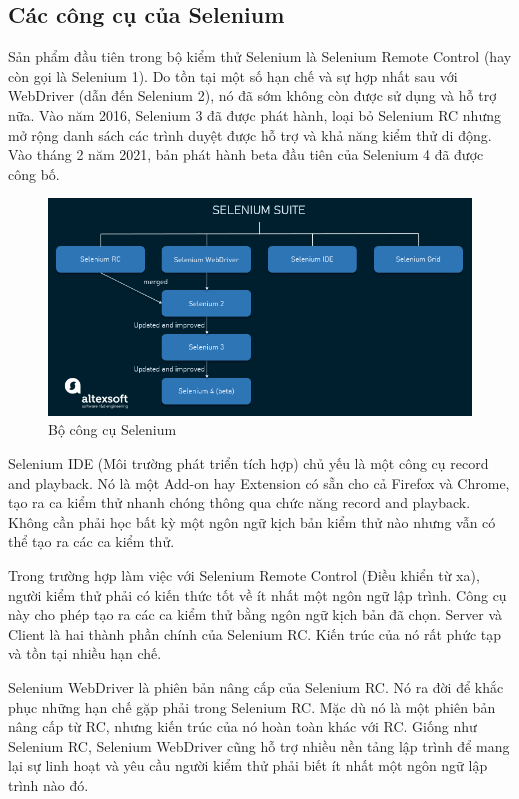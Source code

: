 \documentclass[./../main_file.tex]{subfiles}
\begin{document}
	\subsection{Các công cụ của Selenium}
	
	Sản phẩm đầu tiên trong bộ kiểm thử Selenium là Selenium Remote Control (hay còn gọi là Selenium 1). Do tồn tại một số hạn chế và sự hợp nhất sau với WebDriver (dẫn đến Selenium 2), nó đã sớm không còn được sử dụng và hỗ trợ nữa. Vào năm 2016, Selenium 3 đã được phát hành, loại bỏ Selenium RC nhưng mở rộng danh sách các trình duyệt được hỗ trợ và khả năng kiểm thử di động. Vào tháng 2 năm 2021, bản phát hành beta đầu tiên của Selenium 4 đã được công bố.
	
	\begin{figure}
		\centering
		\includegraphics[width=\linewidth]{./images/image7.png}
		\caption{Bộ công cụ Selenium}
	\end{figure}

	Selenium IDE (Môi trường phát triển tích hợp) chủ yếu là một công cụ record and playback. Nó là một Add-on hay Extension có sẵn cho cả Firefox và Chrome, tạo ra ca kiểm thử nhanh chóng thông qua chức năng record and playback. Không cần phải học bất kỳ một ngôn ngữ kịch bản kiểm thử nào nhưng vẫn có thể tạo ra các ca kiểm thử. 
	
	Trong trường hợp làm việc với Selenium Remote Control (Điều khiển từ xa), người kiểm thử phải có kiến thức tốt về ít nhất một ngôn ngữ lập trình. Công cụ này cho phép tạo ra các ca kiểm thử bằng ngôn ngữ kịch bản đã chọn. Server và Client là hai thành phần chính của Selenium RC. Kiến trúc của nó rất phức tạp và tồn tại nhiều hạn chế.
	
	Selenium WebDriver là phiên bản nâng cấp của Selenium RC. Nó ra đời để khắc phục những hạn chế gặp phải trong Selenium RC. Mặc dù nó là một phiên bản nâng cấp từ RC, nhưng kiến trúc của nó hoàn toàn khác với RC. Giống như Selenium RC, Selenium WebDriver cũng hỗ trợ nhiều nền tảng lập trình để mang lại sự linh hoạt và yêu cầu người kiểm thử phải biết ít nhất một ngôn ngữ lập trình nào đó.
	
\end{document}
